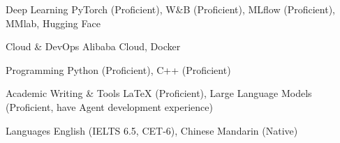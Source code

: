 

\begin{cvskills}

  \cvskill
  {Deep Learning}
  {PyTorch (Proficient), W\&B (Proficient), MLflow (Proficient), MMlab, Hugging Face}

  \cvskill
  {Cloud \& DevOps}
  {Alibaba Cloud, Docker}

  \cvskill
  {Programming}
  {Python (Proficient), C++ (Proficient)}

  \cvskill
  {Academic Writing \& Tools}
  {LaTeX (Proficient), Large Language Models (Proficient, have Agent development experience)}

  \cvskill
  {Languages}
  {English (IELTS 6.5, CET-6), Chinese Mandarin (Native)}

\end{cvskills}
